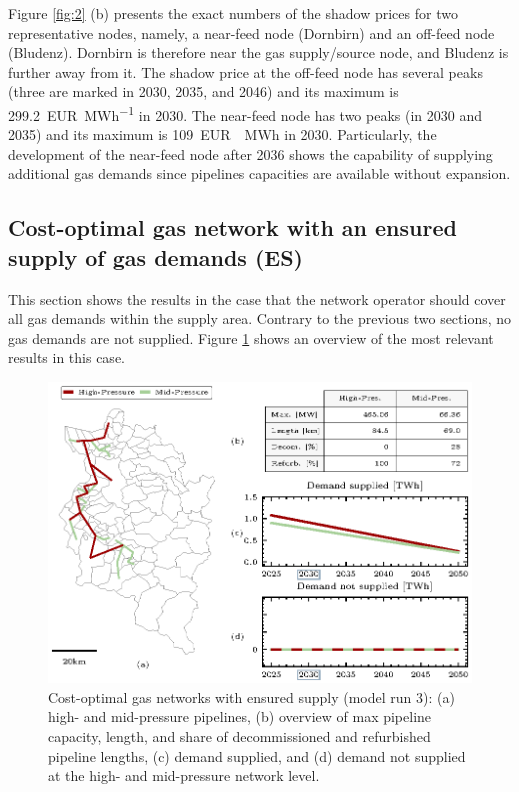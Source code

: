  Figure \ref{fig:2} (b) presents the exact numbers of the shadow prices for two representative nodes, namely, a near-feed node (Dornbirn) and an off-feed node (Bludenz). Dornbirn is therefore near the gas supply/source node, and Bludenz is further away from it. The shadow price at the off-feed node has several peaks (three are marked in 2030, 2035, and 2046) and its maximum is \SI{299.2}{EUR\per MWh} in 2030. The near-feed node has two peaks (in 2030 and 2035) and its maximum is \SI{109}{EUR \per MWh} in 2030. Particularly, the development of the near-feed node after 2036 shows the capability of supplying additional gas demands since pipelines capacities are available without expansion.



\subsection{Cost-optimal gas network with an ensured supply of gas demands (ES)}\label{modelrun3}
This section shows the results in the case that the network operator should cover all gas demands within the supply area. Contrary to the previous two sections, no gas demands are not supplied. Figure \ref{fig:result2} shows an overview of the most relevant results in this case. 

\begin{figure}[h]
	\centering
	\includegraphics[width=1\linewidth]{figures/modelrun3/network.eps}
	\caption{Cost-optimal gas networks with ensured supply (model run 3): (a) high- and mid-pressure pipelines, (b) overview of max pipeline capacity, length, and share of decommissioned and refurbished pipeline lengths, (c) demand supplied, and (d) demand not supplied at the high- and mid-pressure network level.}
	\label{fig:result2}
\end{figure}

